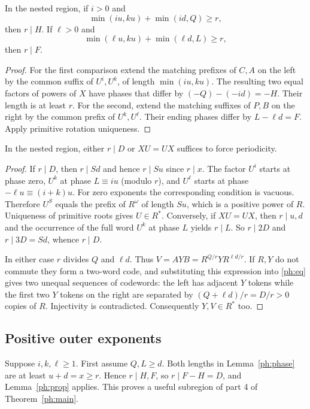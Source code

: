 \begin{lemma}\label{ph:phase}
In the nested region, if $i>0$ and
\[
 \min(iu,ku)+\min(id,Q)\ge r,
\]
then $r\mid H$. If $\ell>0$ and
\[
 \min(\ell u,ku)+\min(\ell d,L)\ge r,
\]
then $r\mid F$.
\end{lemma}
\begin{proof}
For the first comparison extend the matching prefixes of $C,A$ on
the left by the common suffix of $U^i,U^k$, of length $\min(iu,ku)$.
The resulting two equal factors of powers of $X$ have phases that
differ by $(-Q)-(-id)=-H$. Their length is at least $r$. For the
second, extend the matching suffixes of $P,B$ on the right by the
common prefix of $U^k,U^\ell$. Their ending phases differ by $L-\ell
d=F$. Apply primitive rotation uniqueness.
\end{proof}

\begin{lemma}\label{ph:prop}
In the nested region, either $r\mid D$ or $XU=UX$ suffices to force
periodicity.
\end{lemma}
\begin{proof}
If $r\mid D$, then $r\mid Sd$ and hence $r\mid Su$ since $r\mid x$.
The factor $U^i$ starts at phase zero, $U^k$ at phase $L\equiv iu$
(modulo $r$), and $U^\ell$ starts at phase $-\ell u\equiv(i+k)u$.
For zero exponents the corresponding condition is vacuous. Therefore
$U^S$ equals the prefix of $R^\omega$ of length $Su$, which is a
positive power of $R$. Uniqueness of primitive roots gives $U\in R^*$.
Conversely, if $XU=UX$, then $r\mid u,d$ and the occurrence of the
full word $U^k$ at phase $L$ yields $r\mid L$. So $r\mid2D$ and
$r\mid3D=Sd$, whence $r\mid D$.

In either case $r$ divides $Q$ and $\ell d$. Thus
$V=AYB=R^{Q/r}Y R^{\ell d/r}$. If $R,Y$ do not commute they form a
two-word code, and substituting this expression into \eqref{ph:eq}
gives two unequal sequences of codewords: the left has adjacent
$Y$ tokens while the first two $Y$ tokens on the right are separated
by $(Q+\ell d)/r=D/r>0$ copies of $R$. Injectivity is contradicted.
Consequently $Y,V\in R^*$ too.
\end{proof}

\subsection{Positive outer exponents}
Suppose $i,k,\ell\ge1$. First assume $Q,L\ge d$. Both lengths in
Lemma~\ref{ph:phase} are at least $u+d=x\ge r$. Hence $r\mid H,F$,
so $r\mid F-H=D$, and Lemma~\ref{ph:prop} applies. This proves a useful subregion of part 4 of Theorem~\ref{ph:main}.

